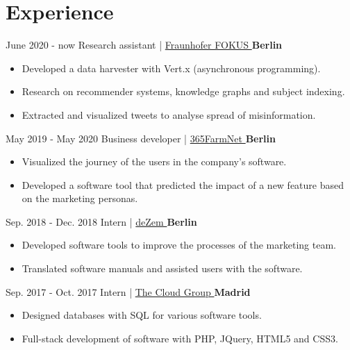 \documentclass[]{commands}
\begin{document}
\section{Experience}
\begin{entrylist}
  \entry
    {June 2020 - now}
    {Research assistant | }
    { \href{https://www.fokus.fraunhofer.de/}{\small Fraunhofer FOKUS \faMousePointer}}
    {\normalsize\textbf{\color{ipsgreen}\faMapMarker\space Berlin}}
    {\jobspace
    \begin{itemize}[leftmargin=*, itemsep = 0.1em]
        \item Developed a data harvester with Vert.x (asynchronous programming).
        \item Research on recommender systems, knowledge graphs and subject indexing.
        \item Extracted and visualized tweets to analyse spread of misinformation.\\
    \end{itemize}}

  \entry
    {May 2019 - May 2020}
    {Business developer | }
    { \href{https://www.365farmnet.com/en/}{\small 365FarmNet \faMousePointer}}
    {\normalsize\textbf{\color{ipsgreen}\faMapMarker\space Berlin}}
    {\jobspace
    \begin{itemize}[leftmargin=*, itemsep = 0.1em]
        \item Visualized the journey of the users in the company's software.
        \item Developed a software tool that predicted the impact of a new feature based on the marketing personas. \\
    \end{itemize}}
    
  \entry
    {Sep. 2018 - Dec. 2018}
    {Intern | }
    { \href{https://www.dezem.de/en/}{\small deZem \faMousePointer}}
    {\normalsize\textbf{\color{ipsgreen}\faMapMarker\space Berlin}}
    {\jobspace
    \begin{itemize}[leftmargin=*, itemsep = 0.1em]
        \item Developed software tools to improve the processes of the marketing team.
        \item Translated software manuals and assisted users with the software. \\
    \end{itemize}}
    
  \entry
    {Sep. 2017 - Oct. 2017}
    {Intern | }
    { \href{https://thecloud.group/}{\small The Cloud Group \faMousePointer}}
    {\normalsize\textbf{\color{ipsgreen}\faMapMarker\space Madrid}}
    {\jobspace
    \begin{itemize}[leftmargin=*, itemsep = 0.1em]
        \item Designed databases with SQL for various software tools. 
        \item Full-stack development of software with PHP, JQuery, HTML5 and CSS3. \\
    \end{itemize}}
    

\end{entrylist}
\end{document}

